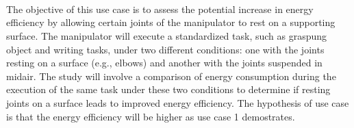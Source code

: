 \documentclass[report.tex]{subfiles}
\begin{document}
    \paragraph{\\}
    The objective of this use case is to assess the potential increase in energy efficiency by allowing certain joints of the manipulator to rest on a supporting surface. The manipulator will execute a standardized task, such as graspung object and writing tasks, under two different conditions: one with the joints resting on a surface (e.g., elbows) and another with the joints suspended in midair. The study will involve a comparison of energy consumption during the execution of the same task under these two conditions to determine if resting joints on a surface leads to improved energy efficiency. The hypothesis of use case is that the energy efficiency will be higher as use case 1 demostrates.
\end{document}
